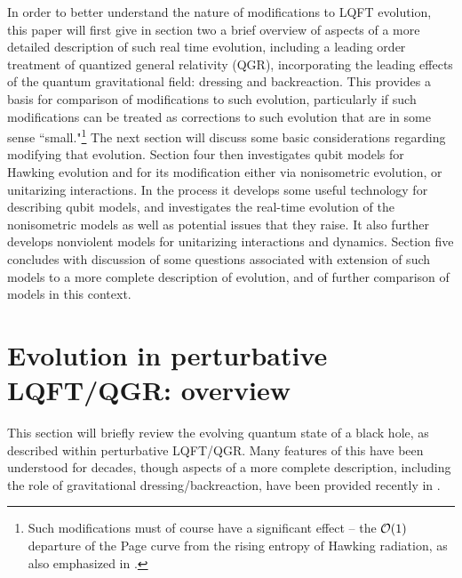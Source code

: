 \documentclass[11pt]{article}
\numberwithin{equation}{section}
\newcommand{\calo}{{\cal O}}
\begin{document}
In order to better understand the nature of modifications to LQFT evolution, this paper will first give in section two a brief overview of aspects of a more detailed description of such real time evolution, including a leading order treatment of quantized general relativity (QGR), incorporating the leading effects of the quantum gravitational field:  dressing and backreaction.  This provides a basis for comparison of modifications to such evolution, particularly if such modifications can be treated as corrections to such evolution that are in some sense ``small."\footnote{Such modifications must of course have a significant effect -- the $\calo(1)$ departure of the Page curve\cite{Pageone,Pagetwo} from the rising entropy of Hawking radiation, as also emphasized in \cite{Mathinforev}.} The next section will discuss some basic considerations regarding modifying that evolution.  Section four then investigates qubit models for Hawking evolution and for its modification either via nonisometric evolution, or unitarizing interactions.  In the process it develops some useful technology for describing qubit models, and  investigates the real-time evolution of the nonisometric models as well as potential issues that they raise.  It also
 further develops nonviolent models for unitarizing interactions and dynamics.  Section five concludes with discussion of some questions associated with extension of such models to a more complete description of evolution, and of further comparison of models in this context.



\section{Evolution in perturbative LQFT/QGR: overview}
\label{QFTsec}


This section will briefly review the  evolving quantum state of a black hole, as described within perturbative LQFT/QGR.  Many features of this have been understood for decades, though aspects of a more complete description, including the role of gravitational dressing/backreaction, have been provided recently in \cite{GiPe1,GiPe2}.
\end{document}
